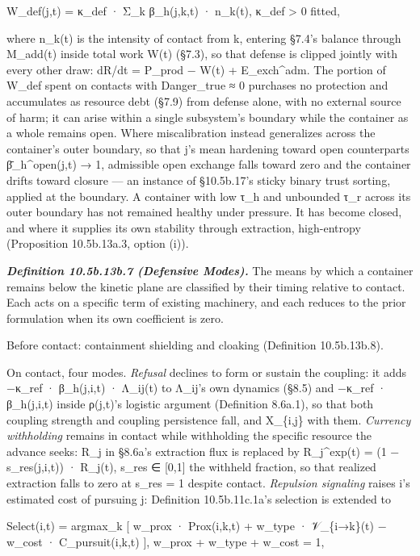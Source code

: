 \documentclass[
]{article}
\begin{document}
W\_def(j,t) = κ\_def · Σ\_k β\_h(j,k,t) · n\_k(t), κ\_def \textgreater{}
0 fitted,

where n\_k(t) is the intensity of contact from k, entering §7.4's balance
through M\_add(t) inside total work W(t) (§7.3), so that defense is
clipped jointly with every other draw: dR/dt = P\_prod − W(t) +
E\_exch\^{}adm. The portion of
W\_def spent on contacts with Danger\_true ≈ 0 purchases no protection
and accumulates as resource debt (§7.9) from defense alone, with no
external source of harm; it can arise within a single subsystem's
boundary while the container as a whole remains open. Where
miscalibration instead generalizes across the container's outer
boundary, so that j's mean hardening toward open counterparts
β̄\_h\^{}open(j,t) → 1, admissible open exchange falls toward zero and
the container drifts toward closure --- an instance of §10.5b.17's sticky
binary trust sorting, applied at the boundary. A container with low τ\_h
and unbounded τ\_r across its outer boundary has not remained healthy
under pressure. It has become closed, and where it supplies its own
stability through extraction, high-entropy (Proposition 10.5b.13a.3,
option (i)).

\emph{\textbf{Definition 10.5b.13b.7 (Defensive Modes).}} The means by
which a container remains below the kinetic plane are classified by
their timing relative to contact. Each acts on a specific term of
existing machinery, and each reduces to the prior formulation when its
own coefficient is zero.

Before contact: containment shielding and cloaking (Definition
10.5b.13b.8).

On contact, four modes. \emph{Refusal} declines to form or sustain the
coupling: it adds −κ\_ref · β\_h(j,i,t) · Λ\_ij(t) to Λ\_ij's own dynamics
(§8.5) and −κ\_ref · β\_h(j,i,t) inside ρ(j,t)'s logistic argument
(Definition 8.6a.1), so that both coupling strength and coupling
persistence fall, and X\_\{i,j\} with them. \emph{Currency withholding}
remains in contact while withholding the specific resource the advance
seeks: R\_j in §8.6a's extraction flux is replaced by R\_j\^{}exp(t) =
(1 − s\_res(j,i,t)) · R\_j(t), s\_res ∈ {[}0,1{]} the withheld fraction, so
that realized extraction falls to zero at s\_res = 1 despite contact.
\emph{Repulsion signaling} raises i's estimated cost of pursuing j:
Definition 10.5b.11c.1a's selection is extended to

Select(i,t) = argmax\_k {[} w\_prox · Prox(i,k,t) + w\_type ·
𝒱\_\{i→k\}(t) − w\_cost · C\_pursuit(i,k,t) {]}, w\_prox + w\_type +
w\_cost = 1,
\end{document}

